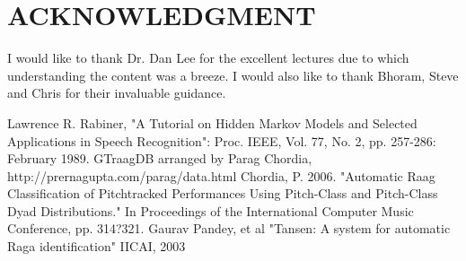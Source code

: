 \documentclass[letterpaper, 10 pt, conference]{ieeeconf}  %
\begin{document}






%

\section*{ACKNOWLEDGMENT}

I would like to thank Dr. Dan Lee for the excellent lectures due to which understanding the content was a breeze. I would also like to thank Bhoram, Steve and Chris for their invaluable guidance.





\begin{thebibliography}{99}

  Lawrence R. Rabiner, "A Tutorial on Hidden Markov Models and Selected Applications in Speech Recognition": Proc. IEEE, Vol. 77, No. 2, pp. 257-286: February 1989.
 GTraagDB arranged by Parag Chordia, http://prernagupta.com/parag/data.html
 Chordia, P. 2006. "Automatic Raag Classification of Pitchtracked Performances Using Pitch-Class and Pitch-Class Dyad Distributions." In Proceedings of the International Computer Music Conference, pp. 314?321.
 Gaurav Pandey, et al "Tansen: A system for automatic Raga identification" IICAI, 2003 

\end{thebibliography}
\end{document}
